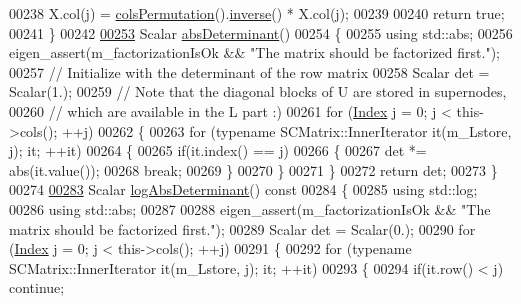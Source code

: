 \begin{DoxyCode}
00238         X.col(j) = \hyperlink{group___sparse_l_u___module_ab7b0d15d0d9fd1faa164298f92ca59cd}{colsPermutation}().\hyperlink{group___core___module_adb9af427f317202366c2832876064eb3}{inverse}() * X.col(j);
00239       
00240       \textcolor{keywordflow}{return} \textcolor{keyword}{true}; 
00241     \}
00242     
\hyperlink{group___sparse_l_u___module_a06fa89424239fb169d408f08252426d0}{00253}     Scalar \hyperlink{group___sparse_l_u___module_a06fa89424239fb169d408f08252426d0}{absDeterminant}()
00254     \{
00255       \textcolor{keyword}{using} std::abs;
00256       eigen\_assert(m\_factorizationIsOk && \textcolor{stringliteral}{"The matrix should be factorized first."});
00257       \textcolor{comment}{// Initialize with the determinant of the row matrix}
00258       Scalar det = Scalar(1.);
00259       \textcolor{comment}{// Note that the diagonal blocks of U are stored in supernodes,}
00260       \textcolor{comment}{// which are available in the  L part :)}
00261       \textcolor{keywordflow}{for} (\hyperlink{namespace_eigen_a62e77e0933482dafde8fe197d9a2cfde}{Index} j = 0; j < this->cols(); ++j)
00262       \{
00263         \textcolor{keywordflow}{for} (\textcolor{keyword}{typename} SCMatrix::InnerIterator it(m\_Lstore, j); it; ++it)
00264         \{
00265           \textcolor{keywordflow}{if}(it.index() == j)
00266           \{
00267             det *= abs(it.value());
00268             \textcolor{keywordflow}{break};
00269           \}
00270         \}
00271       \}
00272       \textcolor{keywordflow}{return} det;
00273     \}
00274 
\hyperlink{group___sparse_l_u___module_a89e30a7df205596784a5a73f4768eaec}{00283}     Scalar \hyperlink{group___sparse_l_u___module_a89e30a7df205596784a5a73f4768eaec}{logAbsDeterminant}()\textcolor{keyword}{ const}
00284 \textcolor{keyword}{    }\{
00285       \textcolor{keyword}{using} std::log;
00286       \textcolor{keyword}{using} std::abs;
00287 
00288       eigen\_assert(m\_factorizationIsOk && \textcolor{stringliteral}{"The matrix should be factorized first."});
00289       Scalar det = Scalar(0.);
00290       \textcolor{keywordflow}{for} (\hyperlink{namespace_eigen_a62e77e0933482dafde8fe197d9a2cfde}{Index} j = 0; j < this->cols(); ++j)
00291       \{
00292         \textcolor{keywordflow}{for} (\textcolor{keyword}{typename} SCMatrix::InnerIterator it(m\_Lstore, j); it; ++it)
00293         \{
00294           \textcolor{keywordflow}{if}(it.row() < j) \textcolor{keywordflow}{continue};

\end{DoxyCode}
